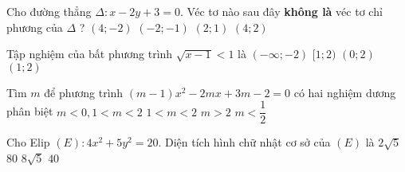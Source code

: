 \begin{ex}%
	Cho đường thẳng $\Delta : x - 2y + 3 = 0$. Véc tơ nào sau đây \textbf{không là} véc tơ chỉ phương của $\Delta$ ?
	\choice
	{\True $(4; -2)$}
	{$(-2; -1)$}
	{$(2;1)$}
	{$(4;2)$}
\end{ex}

\begin{ex}%
	Tập nghiệm của bất phương trình $\sqrt{x-1} < 1$ là
	\choice
	{$(-\infty; -2)$}
	{\True $[1; 2)$}
	{$(0;2)$}
	{$(1;2)$}
\end{ex}

\begin{ex}%
Tìm $m$ để phương trình $(m - 1)x^2 - 2mx + 3m - 2 = 0$ có hai nghiệm dương phân biệt
\choice
{$m < 0, 1 < m < 2$}
{\True $1 < m < 2$}
{$m > 2$}
{$m < \dfrac{1}{2}$}
\end{ex}

\begin{ex}%
Cho Elip $(E) : 4x^2 + 5y^2 = 20$. Diện tích hình chữ nhật cơ sở của $(E)$ là
\choice
{$2\sqrt{5}$}
{$80$}
{\True $8\sqrt{5}$}
{$40$}
\end{ex}

